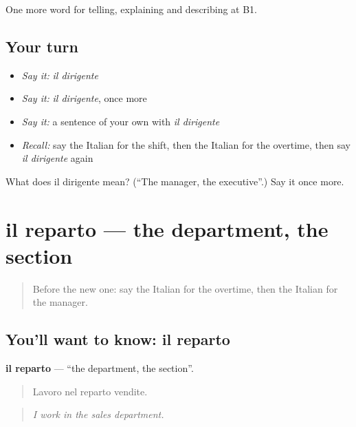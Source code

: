 \begin{grammarlens}[title={What you've built}]
One more word for telling, explaining and describing at B1.
\end{grammarlens}

\subsection*{Your turn}
\begin{itemize}
\raggedright
  \item \emph{Say it:} \emph{il dirigente}
  \item \emph{Say it:} \emph{il dirigente}, once more
  \item \emph{Say it:} a sentence of your own with \emph{il dirigente}
  \item \emph{Recall:} say the Italian for the shift, then the Italian for the overtime, then say \emph{il dirigente} again
\end{itemize}

\begin{tcolorbox}[breakable,colback=teal!4,colframe=teal!35!black,title={Before you move on}]
What does il dirigente mean? (\textquotedblleft{}The manager, the executive\textquotedblright{}.) Say it once more.
\end{tcolorbox}
\section[il reparto]{il reparto — the department, the section}

\label{lesson:IT-C360-reparto}



\begin{quote}
Before the new one: say the Italian for the overtime, then the Italian for the manager.
\end{quote}

\subsection*{You'll want to know: il reparto}
\textbf{il reparto} — \textquotedblleft{}the department, the section\textquotedblright{}.

\begin{quote}
Lavoro nel reparto vendite.
\end{quote}

\begin{quote}
\emph{I work in the sales department.}
\end{quote}

